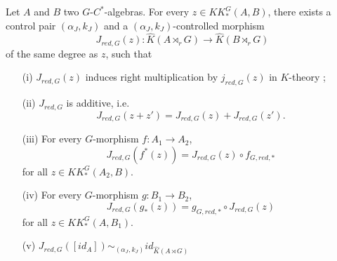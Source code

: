 \begin{prop}\label{Kasparov}
Let $A$ and $B$ two $G$-$C^*$-algebras. For every $z\in KK^G_*(A,B)$, there exists a control pair $(\alpha_J,k_J)$ and a $(\alpha_J,k_J)$-controlled morphism
\[J_{red,G}(z) : \hat K(A\rtimes_r G)\rightarrow \hat K(B\rtimes_r G)\]
of the same degree as $z$, such that
\begin{enumerate}
\item[(i)] $J_{red,G}(z)$ induces right multiplication by $j_{red,G}(z)$ in $K$-theory ;
\item[(ii)] $J_{red,G}$ is additive, i.e.
\[J_{red,G}(z+z')=J_{red,G}(z)+J_{red,G}(z').\]
\item[(iii)] For every $G$-morphism $f : A_1\rightarrow A_2$,
\[J_{red,G}(f^*(z))=J_{red,G}(z)\circ f_{G,red,*}\] for all $z\in KK_*^G(A_2,B)$.
\item[(iv)] For every $G$-morphism $g : B_1\rightarrow B_2$,
\[J_{red,G}(g_*(z))= g_{G,red,*}\circ J_{red,G}(z)\] for all $z\in KK_*^G(A,B_1)$.
\item[(v)] $J_{red,G}([id_A]) \sim_{(\alpha_J,k_J)} id_{\hat K(A\rtimes G)}$
\end{enumerate}
\end{prop}

